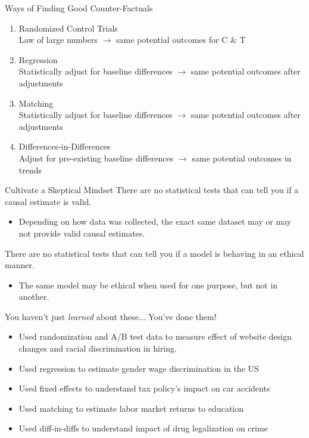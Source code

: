 \documentclass[11pt]{beamer}
\begin{document}
\begin{frame}[c]{Ways of Finding Good Counter-Factuals}
    \begin{enumerate}
      \pause \item Randomized Control Trials \\
      {\color{gray} Law of large numbers $\rightarrow$ same potential outcomes for C \& T}
      \pause \item Regression \\
      {\color{gray} Statistically adjust for baseline differences $\rightarrow$ same potential outcomes after adjustments}
      \pause \item Matching \\
      {\color{gray} Statistically adjust for baseline differences $\rightarrow$ same potential outcomes after adjustments}
      \pause \item Differences-in-Differences \\
      {\color{gray} Adjust for pre-existing baseline differences $\rightarrow$ same potential outcomes in trends}
    \end{enumerate}
\end{frame}


\begin{frame}[c]{Cultivate a Skeptical Mindset}
\pause There are \alert{no statistical tests} that can tell you if a causal estimate is valid. 
\begin{itemize}
    \pause \item Depending on \alert{how} data was collected, the exact same dataset may or may not provide valid causal estimates.
\end{itemize}
\pause There are \alert{no statistical tests} that can tell you if a model is behaving in an ethical manner.
\begin{itemize}
    \pause \item The same model may be ethical when used for one purpose, but not in another.
\end{itemize}
\end{frame}


\begin{frame}[t]{You haven't just \emph{learned} about these...}
    \pause You've done them!
    \begin{itemize}
        \pause \item  Used randomization and A/B test data to measure effect of website design changes and racial discrimination in hiring.
        \pause \item  Used regression to estimate gender wage discrimination in the US
        \pause \item  Used fixed effects to understand tax policy's impact on car accidents
        \pause \item  Used matching to estimate labor market returns to education
        \pause \item  Used diff-in-diffs to understand impact of drug legalization on crime
    \end{itemize}
\end{frame}
\end{document}
